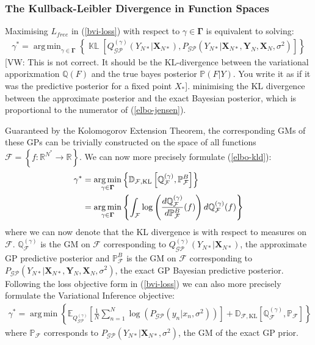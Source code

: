 \documentclass{article}
\newcommand{\vw}[1]{{\color{green} [VW: #1]}}
\newcommand{\KLD}{\operatorname{\mathbb{KL}}}
\newcommand{\GP}{\operatorname{\mathcal{GP}}}
\DeclareMathOperator*{\argmin}{arg\,min}
\numberwithin{equation}{section}
\begin{document}
\subsubsection{The Kullback-Leibler Divergence in Function Spaces}
Maximising $L_{free}$ in (\ref{bvi-loss}) with respect to $\gamma \in \mathbf{\Gamma}$ is equivalent to solving:
\begin{align}
    \gamma^* = \argmin_{\gamma \in \mathbf{\Gamma}} \left\{\KLD \left[ Q_{\GP}^{(\gamma)}\left(Y_{N*} \vert \mathbf{X}_{N*}\right) ,  P_{\GP}\left(Y_{N*} \vert \mathbf{X}_{N*}, \mathbf{Y}_N, \mathbf{X}_N, \sigma^2 \right) \right]\right\}
    \label{elbo-kld}
\end{align}
\vw{This is not correct. It should be the KL-divergence between the variational apporixmation $\mathbb{Q}(F)$ and the true bayes posterior $\mathbb{P}(F|Y)$. You write it as if it was the predictive posterior for a fixed point $X_*$}.
minimising the KL divergence between the approximate posterior and the exact Bayesian posterior, which is proportional to the numerator of (\ref{elbo-jensen}).

Guaranteed by the Kolomogorov Extension Theorem, the corresponding GMs of these GPs can be trivially constructed on the space of all functions $\mathcal{F} = \left\{f: \mathbb{R}^{N^*} \rightarrow \mathbb{R} \right\}$. We can now more precisely formulate (\ref{elbo-kld}):
\begin{align}
    \label{kld-function-spaces}
    \gamma^* &=\argmin_{\gamma \in \mathbf{\Gamma}}  \left\{ \mathbb{D}_{\mathcal{F}, \text{\text{KL}}}\left[ \mathbb{Q}^{(\gamma)}_\mathcal{F},  \mathbb{P}^B_\mathcal{F}\right] \right\} \\
    &= \argmin_{\gamma \in \mathbf{\Gamma}} \left\{\int_{\mathcal{F}} \log \left( \frac{d \mathbb{Q}^{(\gamma)}_\mathcal{F}}{d \mathbb{P}^B_\mathcal{F}} (f)\right)d \mathbb{Q}^{(\gamma)}_\mathcal{F}(f) \right\}
    \label{radon-nikodym}
\end{align}
where we can now denote that the KL divergence is with respect to measures on $\mathcal{F}$. $\mathbb{Q}^{(\gamma)}_\mathcal{F}$ is the GM on $\mathcal{F}$ corresponding to $Q_{\GP}^{(\gamma)}\left(Y_{N*} \vert \mathbf{X}_{N*}\right)$, the approximate GP predictive posterior and $\mathbb{P}^B_\mathcal{F}$ is the GM on $\mathcal{F}$ corresponding to $P_{\GP}\left(Y_{N*} \vert \mathbf{X}_{N*}, \mathbf{Y}_N, \mathbf{X}_N, \sigma^2 \right)$, the exact GP Bayesian predictive posterior. Following the loss objective form in (\ref{bvi-loss}) we can also more precisely formulate the Variational Inference objective:
\begin{align}
    \gamma^* = \argmin \left\{ \mathbb{E}_{Q^{(\gamma)}_{\GP}}\left[\frac{1}{N}\sum_{n=1}^N\log \left(P_{\GP}\left(y_n \vert x_n, \sigma^2\right)\right)\right] + \mathbb{D}_{\mathcal{F}, \text{KL}} \left[\mathbb{Q}^{(\gamma)}_{\mathcal{F}}, \mathbb{P}_{\mathcal{F}} \right] \right\}
    \label{bvi-gm-loss}
\end{align}
where $\mathbb{P}_\mathcal{F}$ corresponds to $P_{\GP}\left(Y_{N*} \vert \mathbf{X}_{N*}, \sigma^2 \right)$, the GM of the exact GP prior.
\end{document}
